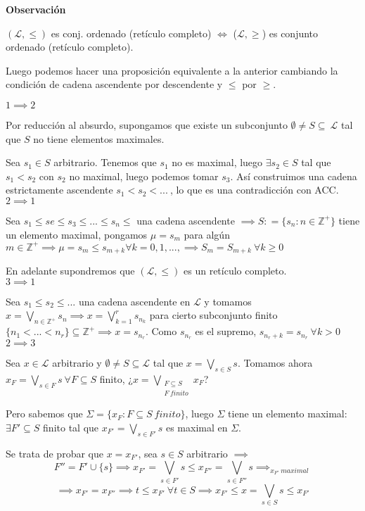 \documentclass[openany]{book}
\begin{document}
\begin{flushright}
    \textbf{Observación}
\end{flushright}

    $ (\mathcal{L},\leq ) $ es conj. ordenado (retículo completo) $ \iff $ ($ \mathcal{L},\geq  $) es conjunto ordenado (retículo completo).

Luego podemos hacer una proposición equivalente a la anterior cambiando la condición de cadena ascendente por descendente y $ \leq  $ por $ \geq  $.

\begin{demonstration}
    $ 1\implies 2 $

    Por reducción al absurdo, supongamos que existe un subconjunto $ \emptyset \ne S \subseteq\ \mathcal{L} $ tal que $ S $ no tiene elementos maximales. 

    Sea $ s_1 \in S $ arbitrario. Tenemos que $ s_1 $ no es maximal, luego $ \exists s_2 \in S $ tal que $ s_1 < s_2 $ con $ s_2 $ no maximal, luego podemos tomar $ s_3 $. Así construimos una cadena estrictamente ascendente $ s_1<s_2<...\ $, lo que es una contradicción con ACC.\\
    $ 2\implies 1 $

    Sea $ s_1\leq se\leq s_3\leq ...\leq s_n\leq  $ una cadena ascendente $ \implies S: = \{s_n : n \in \mathbb{Z}^{+}\} $ tiene un elemento maximal, pongamos $ \mu = s_m $ para algún $ m \in \mathbb{Z}^{+} \implies \mu = s_m \leq  s_{m+k} \forall k = 0,1,..., \implies S_m = S_{m+k}\ \forall k \geq  0$

    En adelante supondremos que $ (\mathcal{L},\leq ) $ es un retículo completo.\\
    $ 3\implies 1 $

    Sea $ s_1\leq s_2\leq ... $ una cadena ascendente en $ \mathcal{L} $ y tomamos $ x = \bigvee_{n \in \mathbb{Z}^{+}}s_n \implies x = \bigvee_{k=1}^{r} s_{n_{k}} $ para cierto subconjunto finito $ \{n_1<...<n_{r}\} \subseteq \mathbb{Z}^{+} \implies x=s_{n_{r}}$. Como $ s_{n_{r}} $ es el supremo, $ s_{n_{r}+k} = s_{n_{r}}\ \forall k >0 $\\
    $ 2\implies 3 $

    Sea $x \in \mathcal{L}$ arbitrario y $ \emptyset \ne S \subseteq \mathcal{L}  $ tal que $ x = \bigvee _{s \in S}s $. Tomamos ahora $ x_{F} = \bigvee_{s \in F}s\ \forall F \subseteq S $ finito, ¿$ x = \bigvee _{\substack{F \subseteq S\\F\ finito}} x_{F}$?
    
    Pero sabemos que $ \Sigma = \{x_{F}:  F \subseteq S\ finito\} $, luego $ \Sigma $ tiene un elemento maximal: $ \exists F' \subseteq  S $ finito tal que $ x_{F'} = \bigvee_{s \in F'} s  $ es maximal en $ \Sigma $.
    
    Se trata de probar que $ x = x_{F'} $, sea $ s \in S $ arbitrario $ \implies$
    $$F'' = F' \cup \{s\} \implies x_{F'} = \bigvee_{s \in F'} s \leq  x_{F''} = \bigvee_{s \in F''} s \implies_{x_{F'}\ maximal}  $$
    $$ \implies x_{F'} = x_{F''} \implies t \leq  x_{F'}\ \forall t \in S \implies x_{F'}\leq x = \bigvee_{s \in S}s \leq  x_{F'} $$
    


\end{demonstration}
\end{document}
